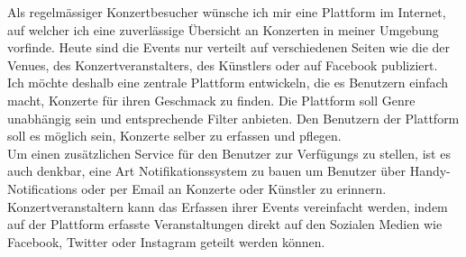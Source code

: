 Als regelmässiger Konzertbesucher wünsche ich mir eine Plattform im
Internet, auf welcher ich eine zuverlässige Übersicht an Konzerten in
meiner Umgebung vorfinde. Heute sind die Events nur verteilt auf
verschiedenen Seiten wie die der Venues, des Konzertveranstalters, des
Künstlers oder auf Facebook publiziert.\\

\noindent
Ich möchte deshalb eine zentrale Plattform entwickeln, die es Benutzern
einfach macht, Konzerte für ihren Geschmack zu finden.
Die Plattform soll Genre unabhängig sein und entsprechende Filter anbieten.
Den Benutzern der Plattform soll es möglich sein, Konzerte selber zu
erfassen und pflegen.\\

\noindent
Um einen zusätzlichen Service für den Benutzer zur Verfügungs zu stellen,
ist es auch denkbar, eine Art Notifikationssystem zu bauen um Benutzer
über Handy-Notifications oder per Email an Konzerte oder Künstler zu
erinnern.\\

\noindent
Konzertveranstaltern kann das Erfassen ihrer Events vereinfacht werden,
indem auf der Plattform erfasste Veranstaltungen direkt auf den Sozialen
Medien wie Facebook, Twitter oder Instagram geteilt werden können.
